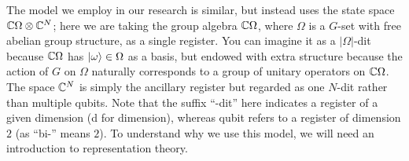\documentclass[12pt,twoside]{reedthesis}
\theoremstyle{plain}   %
\theoremstyle{definition}
\theoremstyle{remark}
\numberwithin{equation}{section}
\begin{document}
  \clearpage

  

  The model we employ in our research is similar, but instead uses the state space $\mathbb{C}\Omega \otimes \mathbb{C}^N$; here we are taking the group algebra $\mathbb{C} \Omega$, where $\Omega$ is a $G$-set with free abelian group structure,
  as a single register. You can imagine it as a $|\Omega|$-dit because $\mathbb{C}\Omega$ has $\ket{\omega} \in \Omega$ as a basis, but endowed with extra structure because the action of $G$ on $\Omega$ naturally corresponds
  to a group of unitary operators on $\mathbb{C}\Omega$. The space $\mathbb{C}^N$ is simply the ancillary register but regarded as one $N$-dit rather than multiple qubits. Note that the suffix ``-dit'' here indicates a register of a given dimension
  (d for dimension),
  whereas qubit refers to a register of dimension $2$ (as ``bi-'' means $2$).
  To understand why we use this model, we will need an introduction to representation theory.
\end{document}
